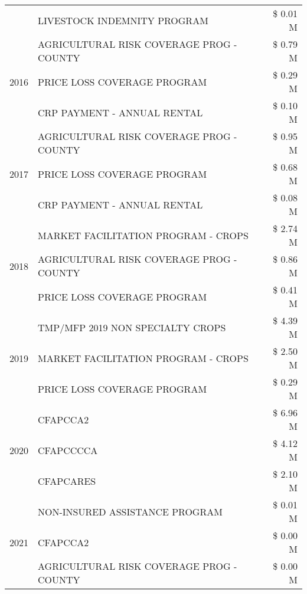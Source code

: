 \begin{tabular}{llr}
 & LIVESTOCK INDEMNITY PROGRAM & \$ 0.01 M \\
\cline{1-3}
\multirow[t]{3}{*}{2016} & AGRICULTURAL RISK COVERAGE PROG - COUNTY & \$ 0.79 M \\
 & PRICE LOSS COVERAGE PROGRAM & \$ 0.29 M \\
 & CRP PAYMENT - ANNUAL RENTAL & \$ 0.10 M \\
\cline{1-3}
\multirow[t]{3}{*}{2017} & AGRICULTURAL RISK COVERAGE PROG - COUNTY & \$ 0.95 M \\
 & PRICE LOSS COVERAGE PROGRAM & \$ 0.68 M \\
 & CRP PAYMENT - ANNUAL RENTAL & \$ 0.08 M \\
\cline{1-3}
\multirow[t]{3}{*}{2018} & MARKET FACILITATION PROGRAM - CROPS & \$ 2.74 M \\
 & AGRICULTURAL RISK COVERAGE PROG - COUNTY & \$ 0.86 M \\
 & PRICE LOSS COVERAGE PROGRAM & \$ 0.41 M \\
\cline{1-3}
\multirow[t]{3}{*}{2019} & TMP/MFP 2019 NON SPECIALTY CROPS & \$ 4.39 M \\
 & MARKET FACILITATION PROGRAM - CROPS & \$ 2.50 M \\
 & PRICE LOSS COVERAGE PROGRAM & \$ 0.29 M \\
\cline{1-3}
\multirow[t]{3}{*}{2020} & CFAPCCA2 & \$ 6.96 M \\
 & CFAPCCCCA & \$ 4.12 M \\
 & CFAPCARES & \$ 2.10 M \\
\cline{1-3}
\multirow[t]{3}{*}{2021} & NON-INSURED ASSISTANCE PROGRAM & \$ 0.01 M \\
 & CFAPCCA2 & \$ 0.00 M \\
 & AGRICULTURAL RISK COVERAGE PROG - COUNTY & \$ 0.00 M \\
\cline{1-3}
\bottomrule
\end{tabular}
